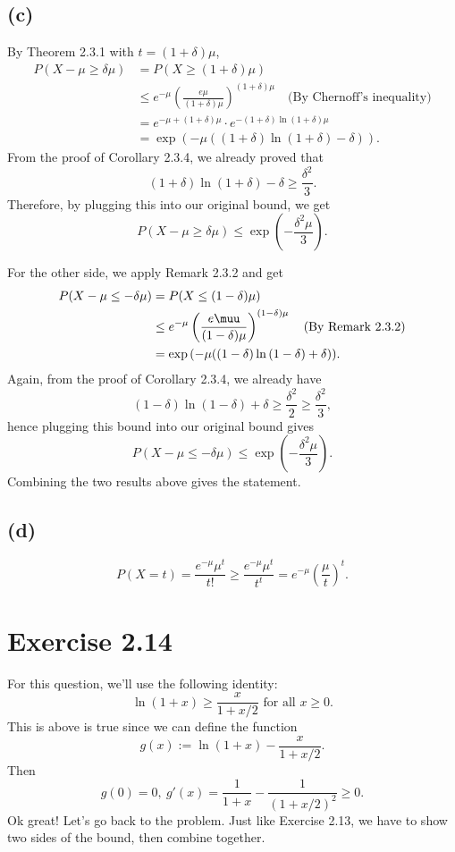 \subsection*{(c)}
By Theorem 2.3.1 with $t = (1 + \delta)\mu$, 
\begin{align*}
	P(X - \mu \geq \delta \mu) 
	&= P(X \geq (1 + \delta)\mu) \\
	&\leq e^{-\mu} \left( \frac{e \mu}{(1 + \delta)\mu} \right)^{(1 + \delta)\mu} 
	\quad \text{(By Chernoff's inequality)} \\
	&= e^{-\mu + (1 + \delta)\mu} \cdot e^{-(1 + \delta)\ln{(1 + \delta)} \mu} \\
	&= \exp{(-\mu((1 + \delta)\ln{(1 + \delta)} - \delta))}.
\end{align*}
From the proof of Corollary 2.3.4, we already proved that 
\[ (1 + \delta)\ln{(1 + \delta)} - \delta \geq \frac{\delta^2}{3}. \]
Therefore, by plugging this into our original bound, we get 
\[ P(X - \mu \geq \delta \mu) \leq \exp{\left( -\frac{\delta^2 \mu}{3} \right)}. \]

For the other side, we apply Remark 2.3.2 and get 
\begin{align*}
	P(X - \mu \leq -\delta \mu) 
	&= P(X \leq (1 - \delta)\mu) \\
	&\leq e^{-\mu} \left( \frac{e \muu}{(1 - \delta)\mu} \right)^{(1 - \delta)\mu} 
	\quad \text{(By Remark 2.3.2)} \\
	&= \exp{(-\mu((1 - \delta)\ln{(1 - \delta)} + \delta))}.
\end{align*}
Again, from the proof of Corollary 2.3.4, we already have 
\[ (1 - \delta)\ln{(1 - \delta)} + \delta \geq \frac{\delta^2}{2} \geq \frac{\delta^2}{3}, \]
hence plugging this bound into our original bound gives
\[ P(X - \mu \leq -\delta \mu) \leq \exp{\left( -\frac{\delta^2 \mu}{3} \right)}. \]
Combining the two results above gives the statement.

\subsection*{(d)}
\[ P(X = t) = \frac{e^{-\mu} \mu^t}{t!} \geq \frac{e^{-\mu} \mu^t}{t^t} 
= e^{-\mu} \left( \frac{\mu}{t} \right)^t. \]


\newpage
\section*{Exercise 2.14}
For this question, we'll use the following identity:
\[ \ln{(1 + x)} \geq \frac{x}{1 + x/2} \text{ for all } x \geq 0. \]
This is above is true since we can define the function
\[ g(x) := \ln{(1 + x)} - \frac{x}{1 + x/2}. \]
Then 
\[ g(0) = 0, \ g'(x) = \frac{1}{1 + x} - \frac{1}{(1 + x/2)^2} \geq 0. \]
Ok great! Let's go back to the problem. Just like Exercise 2.13, we have to show two sides of the bound, then 
combine together.

